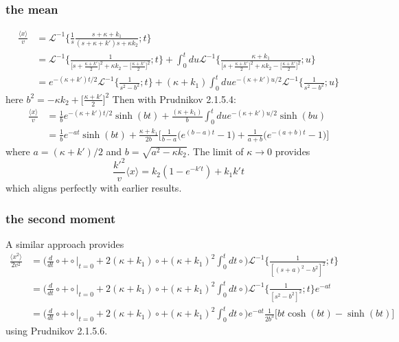 \documentclass[11pt]{article}
\newcommand\be{\begin{equation}} %
\newcommand\ee{\end{equation}}   %
\newcommand\bra{\langle}
\newcommand\ket{\rangle}
\newcommand\El{\mathcal{L}}
\begin{document}
\subsubsection{the mean}
\begin{align}
\frac{\bra x \ket}{v} &= \El^{-1}\Big\{\frac{1}{s}\frac{s+\kappa + k_1}{(s+\kappa + k')s + \kappa k_2};t\Big\} \\
&= \El^{-1}\Big\{\frac{1}{\big[s+\frac{\kappa+k'}{2}\big]^2+\kappa k_2 - \big[\frac{\kappa+k'}{2}\big]^2};t\Big\} + 
\int_0^t du \El^{-1}\Big\{\frac{\kappa + k_1}{\big[s+\frac{\kappa+k'}{2}\big]^2+\kappa k_2 - \big[\frac{\kappa+k'}{2}\big]^2};u\Big\}\\
&= e^{-(\kappa + k')t/2}\El^{-1}\Big\{\frac{1}{s^2 - b^2};t\Big\} + (\kappa + k_1)\int_0^t du e^{-(\kappa + k')u/2}\El^{-1}\Big\{\frac{1}{s^2 - b^2};u\Big\}
\end{align}
here $b^2 = -\kappa k_2 + \big[\frac{\kappa+k'}{2}\big]^2$
Then with Prudnikov 2.1.5.4:
\begin{align}
\frac{\bra x \ket}{v} &= \frac{1}{b}e^{-(\kappa + k')t/2}\sinh(bt) + \frac{(\kappa +k_1)}{b}\int_0^t due^{-(\kappa + k')u/2}\sinh(bu)\\
&=  \frac{1}{b}e^{-at}\sinh(bt) + \frac{\kappa + k_1}{2b}\Big[\frac{1}{b-a}\Big(e^{(b-a)t}-1\Big)+ \frac{1}{a+b}\Big(e^{-(a+b)t}-1\Big)\Big]
\end{align}
where $a=(\kappa + k')/2$ and $b = \sqrt{a^2 -\kappa k_2}$.
The limit of $\kappa \rightarrow 0$ provides
\be \frac{k'^2}{v}\bra x \ket=k_2(1-e^{-k't})+ k_1k't \ee
which aligns perfectly with earlier results.


\subsubsection{the second moment}
A similar approach provides 
\begin{align}
 \frac{\bra x^2 \ket}{2v^2} &= \Big(\frac{d}{dt}\circ + \circ \Big|_{t=0} + 2(\kappa + k_1)\circ + (\kappa+k_1)^2\int_0^t dt \circ \Big)\El^{-1}\Big\{\frac{1}{[(s+a)^2-b^2]^2};t\Big\}\\
&= \Big(\frac{d}{dt}\circ + \circ \Big|_{t=0} + 2(\kappa + k_1)\circ + (\kappa+k_1)^2\int_0^t dt \circ \Big)\El^{-1}\Big\{\frac{1}{[s^2-b^2]^2};t\Big\}e^{-at}\\
&= \Big(\frac{d}{dt}\circ + \circ \Big|_{t=0} + 2(\kappa + k_1)\circ + (\kappa+k_1)^2\int_0^t dt \circ \Big)e^{-at}\frac{1}{2b^3}\Big[bt\cosh(bt)-\sinh(bt)\Big]
\end{align}
using Prudnikov 2.1.5.6.


\end{document}
